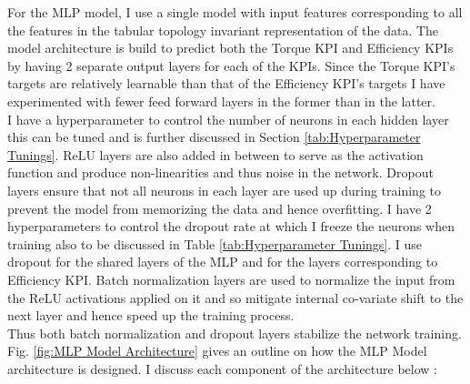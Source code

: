 \documentclass{report} %
\begin{document}
For the \ac{MLP} model, I use a single model with input features corresponding to all the features in the tabular topology invariant representation of the data.
The model architecture is build to predict both the Torque \ac{KPI} and Efficiency \ac{KPI}s by having 2 separate output layers for each of the \ac{KPI}s. 
Since the Torque \ac{KPI}'s targets are relatively learnable than that of the Efficiency \ac{KPI}'s targets I have experimented with fewer feed forward layers in the former than in the latter. \\
I have a hyperparameter to control the number of neurons in each hidden layer this can be tuned and is further discussed in Section \ref{tab:Hyperparameter Tunings}.
\ac{ReLU} layers are also added in between to serve as the activation function and produce non-linearities and thus noise in the network. 
Dropout layers ensure that not all neurons in each layer are used up during training to prevent the model from memorizing the data and hence overfitting.  
I have 2 hyperparameters to control the dropout rate at which I freeze the neurons when training also to be discussed in Table \ref{tab:Hyperparameter Tunings}.
I use dropout for the shared layers of the \ac{MLP} and for the layers corresponding to Efficiency \ac{KPI}.
Batch normalization layers are used to normalize the input from the \ac{ReLU} activations applied on it and so mitigate internal co-variate shift to the next layer and hence speed up the training process.\\
Thus both batch normalization and dropout layers stabilize the network training.
Fig. \ref{fig:MLP Model Architecture} gives an outline on how the \ac{MLP} Model architecture is designed. 
I discuss each component of the architecture below :
\end{document}
